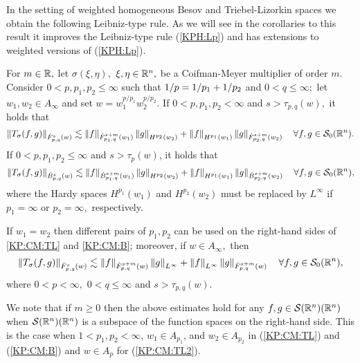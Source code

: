  In the setting of weighted homogeneous Besov and Triebel-Lizorkin spaces we obtain the following Leibniz-type rule. As we will see in the corollaries to this result it improves the Leibniz-type rule (\ref{KPH:Lp}) and has extensions to weighted versions of (\ref{KPH:Lp}).
  
  \begin{theorem}\label{thm:CM:TL:B}  For $m \in \re,$ let $\sigma(\xi,\eta),$ $\xi,\eta\in\rn,$ be a Coifman-Meyer multiplier of order $m.$ Consider  $0 < p, p_1, p_2  \le \infty$  such that $\hcline$ and  $0 < q \leq \infty;$ let  $w_1,w_2\in A_\infty$ and set $w=w_1^{{p}/{p_1}} w_2^{{p}/{p_2}}.$ 
If $0 < p,p_1,p_2 < \infty$ and  $s > \tau_{p,q}(w),$  it holds that
\begin{equation}\label{KP:CM:TL}
\norm{T_\sigma(f,g)}{\tlw{p}{s}{q}{w}} \lesssim \norm{f}{\tlw{p_1}{s+m}{q}{w_1} } \norm{g}{H^{p_2}(w_2)} +  \norm{f}{H^{p_1}(w_1)}   \norm{g}{\tlw{p_2}{s+m}{q}{w_2} } \quad \forall f, g \in \swz.
\end{equation}
If $0< p, p_1,p_2\leq \infty$ and $s > \tau_p(w)$, it holds that
\begin{equation}\label{KP:CM:B}
\norm{T_\sigma(f,g)}{\besw{p}{s}{q}{w}} \lesssim \norm{f}{\besw{p_1}{s+m}{q}{w_1} } \norm{g}{H^{p_2}(w_2)} +  \norm{f}{H^{p_1}(w_1)}   \norm{g}{\besw{p_2}{s+m}{q}{w_2} } \quad \forall f, g \in \swz,
\end{equation}
where the Hardy spaces $H^{p_1}(w_1)$ and $H^{p_2}(w_2)$ must be replaced by $L^\infty$ if $p_1=\infty$ or $p_2=\infty,$ respectively.

If $w_1=w_2$ then different pairs of $p_1, p_2$ can be used on the right-hand sides of \eqref{KP:CM:TL} and \eqref{KP:CM:B}; moreover, if $w\in A_\infty,$ then 
\begin{equation}\label{KP:CM:TL2}
\norm{T_\sigma(f,g)}{\tlw{p}{s}{q}{w}} \lesssim \norm{f}{\tlw{p}{s+m}{q}{w} } \norm{g}{L^\infty} +  \norm{f}{L^\infty}   \norm{g}{\tlw{p}{s+m}{q}{w}} \quad \forall f, g \in \swz,
\end{equation}
where $0<p<\infty,$ $0<q\le\infty$ and $s>\tau_{p,q}(w).$
\end{theorem}
 
We note that if $m\geq 0$ then the above estimates hold for any $f,g\in\sw(\rn)$ when $\sw(\rn)$ is a subspace of the function spaces on the right-hand side. This is the case when $1<p_1,p_2<\infty$, $w_1\in A_{p_1}$, and $w_2\in A_{p_2}$ in (\ref{KP:CM:TL}) and (\ref{KP:CM:B}) and $w\in A_p$ for (\ref{KP:CM:TL2}). 

